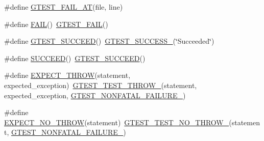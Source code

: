 \begin{DoxyCompactItemize}
\item 
\#define \mbox{\hyperlink{_obj__test_2lib_2googletest-master_2googletest_2include_2gtest_2gtest_8h_acf5a3e2510baccc1a0eccb72da510d98}{G\+T\+E\+S\+T\+\_\+\+F\+A\+I\+L\+\_\+\+AT}}(file,  line)
\item 
\#define \mbox{\hyperlink{_obj__test_2lib_2googletest-master_2googletest_2include_2gtest_2gtest_8h_a3e26a8d27caa386ed0ea7ce9d5b7c4ed}{F\+A\+IL}}()~\mbox{\hyperlink{_obj__test_2lib_2googletest-release-1_88_81_2googletest_2include_2gtest_2gtest_8h_a636231436707c30d6778f79ae96f5dc6}{G\+T\+E\+S\+T\+\_\+\+F\+A\+IL}}()
\item 
\#define \mbox{\hyperlink{_obj__test_2lib_2googletest-master_2googletest_2include_2gtest_2gtest_8h_a2690441c38202728f4159ac2462d9720}{G\+T\+E\+S\+T\+\_\+\+S\+U\+C\+C\+E\+ED}}()~\mbox{\hyperlink{_obj__test_2lib_2googletest-release-1_88_81_2googletest_2include_2gtest_2internal_2gtest-internal_8h_abe012b550eb3807e8c49f7e161bd1567}{G\+T\+E\+S\+T\+\_\+\+S\+U\+C\+C\+E\+S\+S\+\_\+}}(\char`\"{}Succeeded\char`\"{})
\item 
\#define \mbox{\hyperlink{_obj__test_2lib_2googletest-master_2googletest_2include_2gtest_2gtest_8h_a75adcdf89f69b0b615e395daafc315af}{S\+U\+C\+C\+E\+ED}}()~\mbox{\hyperlink{_obj__test_2lib_2googletest-release-1_88_81_2googletest_2include_2gtest_2gtest_8h_a2690441c38202728f4159ac2462d9720}{G\+T\+E\+S\+T\+\_\+\+S\+U\+C\+C\+E\+ED}}()
\item 
\#define \mbox{\hyperlink{_obj__test_2lib_2googletest-master_2googletest_2include_2gtest_2gtest_8h_a789842b4475eed948e6fd18390d5a859}{E\+X\+P\+E\+C\+T\+\_\+\+T\+H\+R\+OW}}(statement,  expected\+\_\+exception)~\mbox{\hyperlink{_obj__test_2lib_2googletest-release-1_88_81_2googletest_2include_2gtest_2internal_2gtest-internal_8h_a3f71db93eaf30b0cfca9612b9ac32106}{G\+T\+E\+S\+T\+\_\+\+T\+E\+S\+T\+\_\+\+T\+H\+R\+O\+W\+\_\+}}(statement, expected\+\_\+exception, \mbox{\hyperlink{_obj__test_2lib_2googletest-release-1_88_81_2googletest_2include_2gtest_2internal_2gtest-internal_8h_a6cb7482cfa03661a91c698eb5895f642}{G\+T\+E\+S\+T\+\_\+\+N\+O\+N\+F\+A\+T\+A\+L\+\_\+\+F\+A\+I\+L\+U\+R\+E\+\_\+}})
\item 
\#define \mbox{\hyperlink{_obj__test_2lib_2googletest-master_2googletest_2include_2gtest_2gtest_8h_a2743a1438137ad857aa3f9fec3ff67ec}{E\+X\+P\+E\+C\+T\+\_\+\+N\+O\+\_\+\+T\+H\+R\+OW}}(statement)~\mbox{\hyperlink{_obj__test_2lib_2googletest-release-1_88_81_2googletest_2include_2gtest_2internal_2gtest-internal_8h_a9a109d026b5a904646437d7570e13581}{G\+T\+E\+S\+T\+\_\+\+T\+E\+S\+T\+\_\+\+N\+O\+\_\+\+T\+H\+R\+O\+W\+\_\+}}(statement, \mbox{\hyperlink{_obj__test_2lib_2googletest-release-1_88_81_2googletest_2include_2gtest_2internal_2gtest-internal_8h_a6cb7482cfa03661a91c698eb5895f642}{G\+T\+E\+S\+T\+\_\+\+N\+O\+N\+F\+A\+T\+A\+L\+\_\+\+F\+A\+I\+L\+U\+R\+E\+\_\+}})

\end{DoxyCompactItemize}
